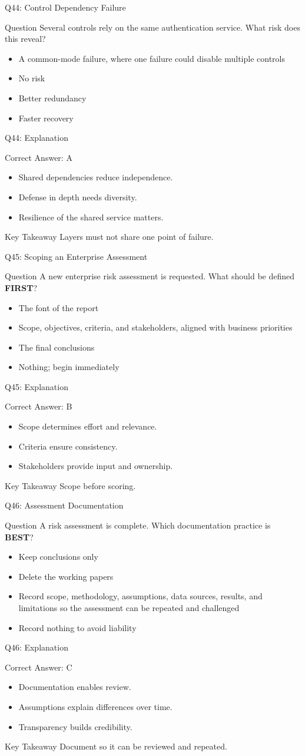 \documentclass[aspectratio=169]{beamer}
\newcommand{\hq}[7]{%
	\begin{frame}{Q#1: #2}
		\begin{block}{Question}
			#3
		\end{block}
		\begin{itemize}
			#4
		\end{itemize}
	\end{frame}
	\begin{frame}{Q#1: Explanation}
		\begin{block}{Correct Answer: #5}
			\begin{itemize}
				#6
			\end{itemize}
		\end{block}
		\begin{alertblock}{Key Takeaway}
			#7
		\end{alertblock}
	\end{frame}
}
\begin{document}
	\hq{44}{Control Dependency Failure}
	{Several controls rely on the same authentication service. What risk does this reveal?}
	{\item[\textbf{(A)}] A common-mode failure, where one failure could disable multiple controls
		\item[\textbf{(B)}] No risk
		\item[\textbf{(C)}] Better redundancy
		\item[\textbf{(D)}] Faster recovery}
	{A}
	{\item Shared dependencies reduce independence.
		\item Defense in depth needs diversity.
		\item Resilience of the shared service matters.}
	{Layers must not share one point of failure.}

	\hq{45}{Scoping an Enterprise Assessment}
	{A new enterprise risk assessment is requested. What should be defined \textbf{FIRST}?}
	{\item[\textbf{(A)}] The font of the report
		\item[\textbf{(B)}] Scope, objectives, criteria, and stakeholders, aligned with business priorities
		\item[\textbf{(C)}] The final conclusions
		\item[\textbf{(D)}] Nothing; begin immediately}
	{B}
	{\item Scope determines effort and relevance.
		\item Criteria ensure consistency.
		\item Stakeholders provide input and ownership.}
	{Scope before scoring.}

	\hq{46}{Assessment Documentation}
	{A risk assessment is complete. Which documentation practice is \textbf{BEST}?}
	{\item[\textbf{(A)}] Keep conclusions only
		\item[\textbf{(B)}] Delete the working papers
		\item[\textbf{(C)}] Record scope, methodology, assumptions, data sources, results, and limitations so the assessment can be repeated and challenged
		\item[\textbf{(D)}] Record nothing to avoid liability}
	{C}
	{\item Documentation enables review.
		\item Assumptions explain differences over time.
		\item Transparency builds credibility.}
	{Document so it can be reviewed and repeated.}
\end{document}
